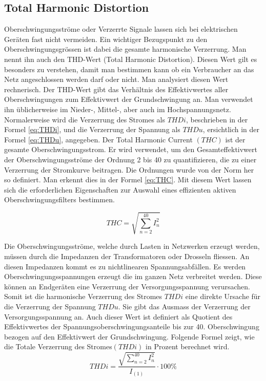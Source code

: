 \subsection{Total Harmonic Distortion}
Oberschwingungsströme oder Verzerrte Signale lassen sich bei elektrischen Geräten fast nicht vermeiden. Ein wichtiger Bezugspunkt zu den Oberschwingungsgrössen ist dabei die gesamte harmonische Verzerrung. Man nennt ihn auch den THD-Wert (Total Harmonic Distortion). Diesen Wert gilt es besonders zu verstehen, damit man bestimmen kann ob ein Verbraucher an das Netz angeschlossen werden darf oder nicht. Man analysiert diesen Wert rechnerisch. Der THD-Wert gibt das Verhältnis des Effektivwertes aller Oberschwingungen zum Effektivwert der Grundschwingung an. Man verwendet ihn üblicherweise im Nieder-, Mittel-, aber auch im Hochspannungsnetz. Normalerweise wird die Verzerrung des Stromes als $THDi$, beschrieben in der Formel \ref{eq:THDi}, und die Verzerrung der Spannung als $THDu$, ersichtlich in der Formel \ref{eq:THDu}, angegeben. Der Total Harmonic Current $(THC)$ ist der gesamte Oberschwingungsstrom. Er wird verwendet, um den Gesamteffektivwert der Oberschwingungsströme der Ordnung 2 bis 40 zu quantifizieren, die zu einer Verzerrung der Stromkurve beitragen. Die Ordnungen wurde von der Norm her so definiert. Man erkennt dies in der Formel \ref{eq:THC}. Mit diesem Wert lassen sich die erforderlichen Eigenschaften zur Auswahl eines effizienten aktiven Oberschwingungsfilters bestimmen.

\begin{equation}\label{eq:THC}
THC = {\sqrt{\sum_{n=2}^{40} I_n^2}}
\end{equation}



Die Oberschwingungsströme, welche durch Lasten in Netzwerken erzeugt werden, müssen durch die Impedanzen der Transformatoren oder Drosseln fliessen. An diesen Impedanzen kommt es zu nichtlinearen Spannungsabfällen. Es werden Oberschwingungsspannungen erzeugt die im ganzen Netz verbreitet werden. Diese können an Endgeräten eine Verzerrung der Versorgungsspannung verursachen. Somit ist die harmonische Verzerrung des Stromes $THDi$ eine direkte Ursache für die Verzerrung der Spannung $THDu$. Sie gibt das Ausmass der Verzerrung der Versorgungsspannung an. Auch dieser Wert ist definiert als Quotient des Effektivwertes der Spannungsoberschwingungsanteile bis zur 40. Oberschwingung bezogen auf den Effektivwert der Grundschwingung. 
Folgende Formel zeigt, wie die Totale Verzerrung des Stromes$(THDi)$ in Prozent berechnet wird.
\begin{equation}\label{eq:THDi}
THDi = \frac{\sqrt{\sum_{n=2}^{40} I_n^2}}{I_{(1)}} \cdot 100 \%
\end{equation}


